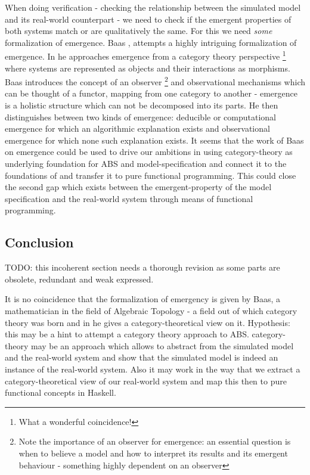 When doing verification - checking the relationship between the simulated model and its real-world counterpart - we need to check if the emergent properties of both systems match or are qualitatively the same. For this we need \textit{some} formalization of emergence.
Baas \cite{baas_emergence_1994}, \cite{baas_emergence_1997} attempts a highly intriguing formalization of emergence. In \cite{baas_emergence_1997} he approaches emergence from a category theory perspective \footnote{What a wonderful coincidence!} where systems are represented as objects and their interactions as morphisms. Baas introduces the concept of an observer \footnote{Note the importance of an observer for emergence: an essential question is when to believe a model and how to interpret its results and its emergent behaviour - something highly dependent on an observer} and observational mechanisms which can be thought of a functor, mapping from one category to another - emergence is a holistic structure which can not be decomposed into its parts. He then distinguishes between two kinds of emergence: deducible or computational emergence for which an algorithmic explanation exists and observational emergence for which none such explanation exists. It seems that the work of Baas on emergence could be used to drive our ambitions in using category-theory as underlying foundation for ABS and model-specification and connect it to the foundations of and transfer it to pure functional programming. This could close the second gap which exists between the emergent-property of the model specification and the real-world system through means of functional programming.

\subsection{Conclusion}
TODO: this incoherent section needs a thorough revision as some parts are obsolete, redundant and weak expressed.

It is no coincidence that the formalization of emergency is given by Baas, a mathematician in the field of Algebraic Topology - a field out of which category theory was born and in \cite{baas_emergence_1997} he gives a category-theoretical view on it.
Hypothesis: this may be a hint to attempt a category theory approach to ABS. category-theory may be an approach which allows to abstract from the simulated model and the real-world system and show that the simulated model is indeed an instance of the real-world system. Also it may work in the way that we extract a category-theoretical view of our real-world system and map this then to pure functional concepts in Haskell.

